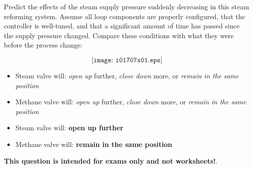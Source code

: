 

Predict the effects of the steam supply pressure suddenly decreasing in this steam reforming system.  Assume all loop components are properly configured, that the controller is well-tuned, and that a significant amount of time has passed since the supply pressure changed.  Compare these conditions with what they were before the process change: 

$$\texttt{[image: i01707x01.eps]}$$

\begin{itemize}
\item{} Steam valve will: {\it open up} further, {\it close down} more, or {\it remain in the same position} 
\vskip 10pt
\item{} Methane valve will: {\it open up} further, {\it close down} more, or {\it remain in the same position} 
\end{itemize}







\begin{itemize}
\item{} Steam valve will: {\bf open up further}
\vskip 5pt
\item{} Methane valve will: {\bf remain in the same position}
\end{itemize}







{\bf This question is intended for exams only and not worksheets!}.



